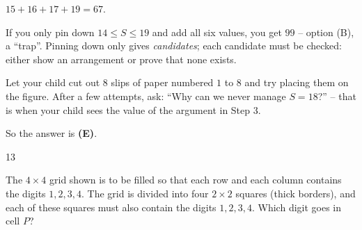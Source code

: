 {
$15 + 16 + 17 + 19 = 67$.
\begin{warnbox}If you only pin down $14 \le S \le 19$ and add all six values, you get $99$ -- option (B), a ``trap''. Pinning down only gives
\emph{candidates}; each candidate must be checked: either show an arrangement or prove that none exists.\end{warnbox}
\begin{parentbox}Let your child cut out $8$ slips of paper numbered $1$ to $8$ and try placing them on the figure. After a few attempts, ask:
``Why can we never manage $S = 18$?'' -- that is when your child sees the value of the argument in Step 3.\end{parentbox}
So the answer is \textbf{(E)}.
}

\begin{probbox}{13}{\relax}
\begin{minipage}[t]{0.62\linewidth}
The $4\times 4$ grid shown is to be filled so that each row and each column contains the digits $1, 2, 3, 4$. The grid is divided into four
$2\times 2$ squares (thick borders), and each of these squares must also contain the digits $1, 2, 3, 4$. Which digit goes in cell $P$?
\end{minipage}\hfill
\begin{minipage}[t]{0.33\linewidth}\vspace{4pt}\centering
{}
\end{minipage}
\end{probbox}
